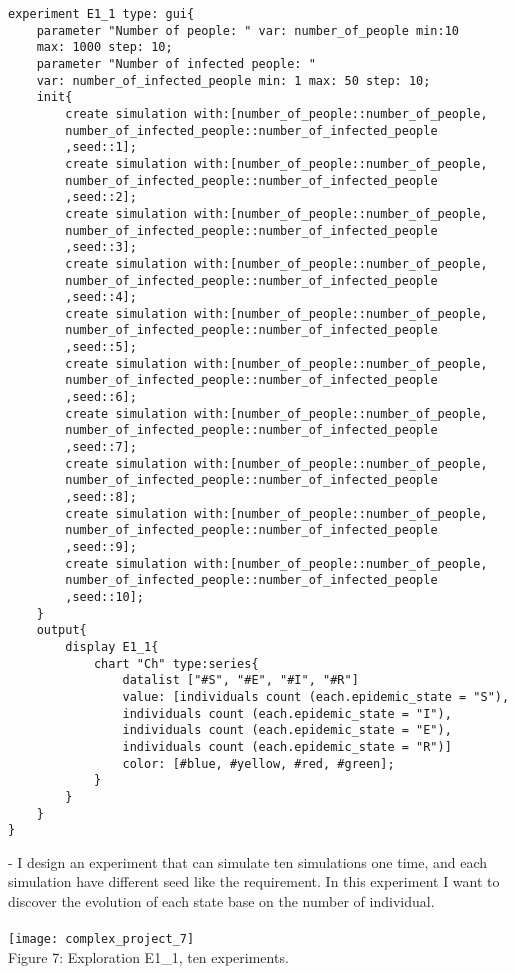 \documentclass{article}
\begin{document}
\begin{tcolorbox}
\begin{lstlisting}
experiment E1_1 type: gui{
	parameter "Number of people: " var: number_of_people min:10 
	max: 1000 step: 10;
	parameter "Number of infected people: " 
	var: number_of_infected_people min: 1 max: 50 step: 10;
	init{
		create simulation with:[number_of_people::number_of_people,
		number_of_infected_people::number_of_infected_people
		,seed::1];
		create simulation with:[number_of_people::number_of_people,
		number_of_infected_people::number_of_infected_people
		,seed::2];
		create simulation with:[number_of_people::number_of_people,
		number_of_infected_people::number_of_infected_people
		,seed::3];
		create simulation with:[number_of_people::number_of_people,
		number_of_infected_people::number_of_infected_people
		,seed::4];
		create simulation with:[number_of_people::number_of_people,
		number_of_infected_people::number_of_infected_people
		,seed::5];
		create simulation with:[number_of_people::number_of_people,
		number_of_infected_people::number_of_infected_people
		,seed::6];
		create simulation with:[number_of_people::number_of_people,
		number_of_infected_people::number_of_infected_people
		,seed::7];
		create simulation with:[number_of_people::number_of_people,
		number_of_infected_people::number_of_infected_people
		,seed::8];
		create simulation with:[number_of_people::number_of_people,
		number_of_infected_people::number_of_infected_people
		,seed::9];
		create simulation with:[number_of_people::number_of_people,
		number_of_infected_people::number_of_infected_people
		,seed::10];
	}
	output{
		display E1_1{
			chart "Ch" type:series{
				datalist ["#S", "#E", "#I", "#R"] 
				value: [individuals count (each.epidemic_state = "S"), 		
				individuals count (each.epidemic_state = "I"),			
				individuals count (each.epidemic_state = "E"), 				
				individuals count (each.epidemic_state = "R")] 
				color: [#blue, #yellow, #red, #green]; 			  
			}
		}
	}
}
\end{lstlisting}
\end{tcolorbox}
- I design an experiment that can simulate ten simulations one time, and each simulation have different seed like the requirement. In this experiment I want to discover the evolution of each state base on the number of individual.
\\\\
\texttt{[image: complex\_project\_7]}
\\
\caption{Figure 7: Exploration E1\_1, ten experiments.}
\end{document}
